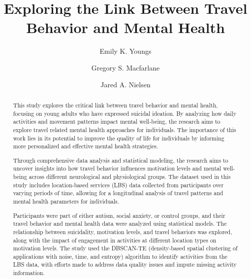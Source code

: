 \documentclass[
  letterpaper,
  number,
  review,
  3p]{elsarticle}
\begin{document}
\begin{frontmatter}
\title{Exploring the Link Between Travel Behavior and Mental Health}
\author[1]{Emily K. Youngs%
%
}
\author[1]{Gregory S. Macfarlane%
%
}
\author[2]{Jared A. Nielsen%
%
}





        
\begin{abstract}
This study explores the critical link between travel behavior and mental
health, focusing on young adults who have expressed suicidal ideation.
By analyzing how daily activities and movement patterns impact mental
well-being, the research aims to explore travel related mental health
approaches for individuals. The importance of this work lies in its
potential to improve the quality of life for individuals by informing
more personalized and effective mental health strategies.

Through comprehensive data analysis and statistical modeling, the
research aims to uncover insights into how travel behavior influences
motivation levels and mental well-being across different neurological
and physiological groups. The dataset used in this study includes
location-based services (LBS) data collected from participants over
varying periods of time, allowing for a longitudinal analysis of travel
patterns and mental health parameters for individuals.

Participants were part of either autism, social anxiety, or control
groups, and their travel behavior and mental health data were analyzed
using statistical models. The relationship between suicidality,
motivation levels, and travel behaviors was explored, along with the
impact of engagement in activities at different location types on
motivation levels. The study used the DBSCAN-TE (density-based spatial
clustering of applications with noise, time, and entropy) algorithm to
identify activities from the LBS data, with efforts made to address data
quality issues and impute missing activity information.


\end{abstract}
\end{frontmatter}
\end{document}

